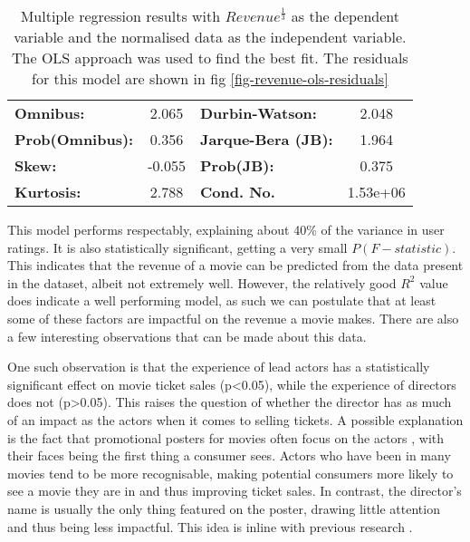 \begin{table}[H]
\begin{center}
\begin{tabular}{lclc}
                    \textbf{Omnibus:}       &  2.065 & \textbf{  Durbin-Watson:     } &    2.048  \\
                    \textbf{Prob(Omnibus):} &  0.356 & \textbf{  Jarque-Bera (JB):  } &    1.964  \\
                    \textbf{Skew:}          & -0.055 & \textbf{  Prob(JB):          } &    0.375  \\
                    \textbf{Kurtosis:}      &  2.788 & \textbf{  Cond. No.          } & 1.53e+06  \\
                \bottomrule
                \end{tabular}
            \end{center}
            
            \caption[short]{Multiple regression results with $Revenue^{\frac{1}{3}}$ as the dependent variable
                            and the normalised data as the independent variable. The OLS approach was used to
                            find the best fit. The residuals for this model are shown in fig \ref{fig-revenue-ols-residuals}}\label{tab-revenue-ols-summary}
        \end{table}
        This model performs respectably, explaining about  40\% of the variance in user ratings.
        It is also statistically significant, getting a very small  $P(F-statistic)$.
        This indicates that the revenue of a movie can be predicted from the data present in the dataset,
            albeit not extremely well.
        However, the relatively good $R^2$ value does indicate a well performing model, as such
            we can postulate that at least some of these factors are impactful on the revenue a 
            movie makes.
        There are also a few interesting observations that can be made about this data.

        One such observation is that the experience of lead actors has a statistically significant effect
            on movie ticket sales (p<0.05), while the experience of directors does not (p>0.05). 
        This raises the question of whether the director has as much of an impact as the actors when it
            comes to selling tickets.
        A possible explanation is the fact that promotional posters for movies often focus on the
            actors \cite{label}, with their faces being the first thing a consumer sees.
        Actors who have been in many movies tend to be more recognisable, making potential consumers more
            likely to see a movie they are in and thus improving ticket sales.
        In contrast, the director's name is usually the only thing featured on the poster, drawing little
            attention and thus being less impactful.
        This idea is inline with previous research \cite{label}.

